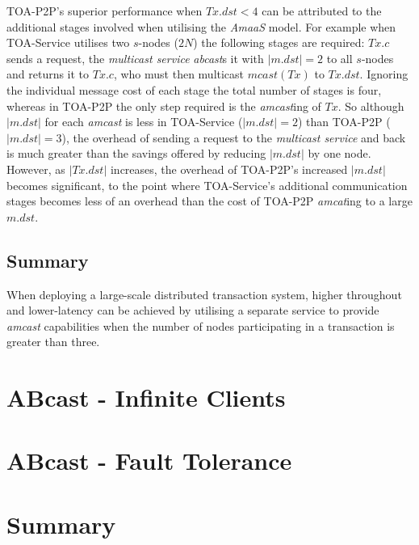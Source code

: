 	TOA-P2P's superior performance when $Tx.dst < 4$ can be attributed to the additional stages involved when utilising the \emph{AmaaS} model.  For example when TOA-Service utilises two $s$-nodes ($2N$) the following stages are required: $Tx.c$ sends a request, the \emph{multicast service} \emph{abcast}s it with $|m.dst| = 2$ to all $s$-nodes and returns it to $Tx.c$, who must then multicast $mcast(Tx)$ to $Tx.dst$.  Ignoring the individual message cost of each stage the total number of stages is four, whereas in TOA-P2P the only step required is the \emph{amcast}ing of $Tx$.  So although $|m.dst|$ for each \emph{amcast} is less in TOA-Service ($|m.dst| = 2$) than TOA-P2P ($|m.dst| = 3$), the overhead of sending a request to the \emph{multicast service} and back is much greater than the savings offered by reducing $|m.dst|$ by one node.  However, as $|Tx.dst|$ increases, the overhead of TOA-P2P's increased $|m.dst|$ becomes significant, to the point where TOA-Service's additional communication stages becomes less of an overhead than the cost of TOA-P2P \emph{amcat}ing to a large $m.dst$.  
	
	\subsection*{Summary}
	When deploying a large-scale distributed transaction system, higher throughout and lower-latency can be achieved by utilising a separate service to provide \emph{amcast} capabilities when the number of nodes participating in a transaction is greater than three.  

\section{ABcast - Infinite Clients}

\section{ABcast - Fault Tolerance}

\section{Summary}
